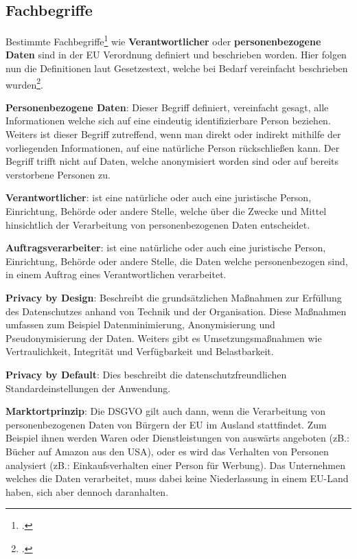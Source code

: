 \subsection{Fachbegriffe}
Bestimmte Fachbegriffe\footcite{Lehrunterlagen-HTL-cloud} wie \textbf{Verantwortlicher} oder \textbf{personenbezogene Daten} sind in der EU Verordnung definiert und beschrieben worden. Hier folgen nun die Definitionen laut Gesetzestext, welche bei Bedarf vereinfacht beschrieben wurden\footcite{mehr-dsgvo}. 

\textbf{Personenbezogene Daten}: Dieser Begriff definiert, vereinfacht gesagt, alle Informationen welche sich auf eine eindeutig identifizierbare Person beziehen. Weiters ist dieser Begriff zutreffend, wenn man direkt oder indirekt mithilfe der vorliegenden Informationen, auf eine natürliche Person rückschließen kann.
Der Begriff trifft nicht auf Daten, welche anonymisiert worden sind oder auf bereits verstorbene Personen zu.

\textbf{Verantwortlicher}: ist eine natürliche oder auch eine juristische Person, Einrichtung, Behörde oder andere Stelle, welche über die Zwecke und Mittel hinsichtlich der Verarbeitung von personenbezogenen Daten entscheidet.

\textbf{Auftragsverarbeiter}: ist eine natürliche oder auch eine juristische Person, Einrichtung, Behörde oder andere Stelle, die Daten welche personenbezogen sind, in einem Auftrag eines Verantwortlichen verarbeitet.

\textbf{Privacy by Design}: Beschreibt die grundsätzlichen Maßnahmen zur Erfüllung des Datenschutzes anhand von Technik und der Organisation. Diese Maßnahmen umfassen zum Beispiel Datenminimierung, Anonymisierung und Pseudonymisierung der Daten. Weiters gibt es Umsetzungsmaßnahmen wie Vertraulichkeit, Integrität und Verfügbarkeit und Belastbarkeit.

\textbf{Privacy by Default}: Dies beschreibt die datenschutzfreundlichen Standardeinstellungen der Anwendung.

\textbf{Marktortprinzip}: Die DSGVO gilt auch dann, wenn die Verarbeitung von personenbezogenen Daten von Bürgern der EU im Ausland stattfindet.
Zum Beispiel ihnen werden Waren oder Dienstleistungen von auswärts angeboten (zB.: Bücher auf Amazon aus den USA), oder es wird das Verhalten von Personen
analysiert (zB.: Einkaufsverhalten einer Person für Werbung). Das Unternehmen welches die Daten verarbeitet, muss dabei keine Niederlassung in einem EU-Land haben, sich aber dennoch daranhalten.

